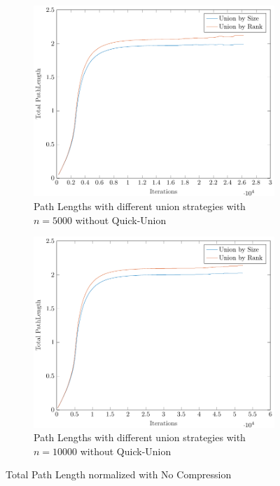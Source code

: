 \begin{figure}[ht]
\begin{subfigure}{0.32\textwidth}
    \end{subfigure}%
    \hfill
    \begin{subfigure}{0.32\textwidth}
        \centering
        \includegraphics[width=\textwidth]{../images/plotNCNonFull5000_PathLength.pdf}
        \caption{Path Lengths with different union strategies with $n = 5000$ without Quick-Union}
    \end{subfigure}%
    \hfill
    \begin{subfigure}{0.32\textwidth}
        \centering
        \includegraphics[width=\textwidth]{../images/plotNCNonFull10000_PathLength.pdf}
        \caption{Path Lengths with different union strategies with $n = 10000$ without Quick-Union}
    \end{subfigure}

    \caption{Total Path Length normalized with No Compression}
    \label{fig:tplNC}
\end{figure}
